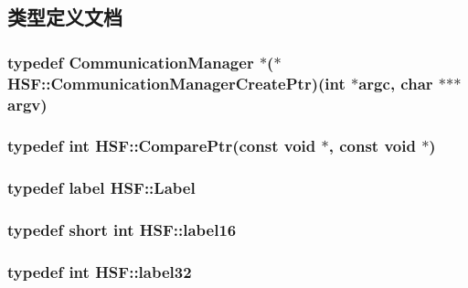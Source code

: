 \subsection{类型定义文档}
\hypertarget{namespaceHSF_ab45d53c3824fdb265043e9e65c1665b5}{
\subsubsection[{CommunicationManagerCreatePtr}]{\setlength{\rightskip}{0pt plus 5cm}typedef {\bf CommunicationManager} $\ast$($\ast$ {\bf HSF::CommunicationManagerCreatePtr})(int $\ast$argc, char $\ast$$\ast$$\ast$argv)}}
\label{namespaceHSF_ab45d53c3824fdb265043e9e65c1665b5}
\hypertarget{namespaceHSF_ad5c260e0fc81004bced4ebf9662faf7f}{
\subsubsection[{ComparePtr}]{\setlength{\rightskip}{0pt plus 5cm}typedef int {\bf HSF::ComparePtr}(const void $\ast$, const void $\ast$)}}
\label{namespaceHSF_ad5c260e0fc81004bced4ebf9662faf7f}
\hypertarget{namespaceHSF_ae65d72be782e989396ebe5ec6ae4c2b6}{
\subsubsection[{Label}]{\setlength{\rightskip}{0pt plus 5cm}typedef label {\bf HSF::Label}}}
\label{namespaceHSF_ae65d72be782e989396ebe5ec6ae4c2b6}
\hypertarget{namespaceHSF_aa78ed21ca4d118cc69c8d1451a4a95f5}{
\subsubsection[{label16}]{\setlength{\rightskip}{0pt plus 5cm}typedef short int {\bf HSF::label16}}}
\label{namespaceHSF_aa78ed21ca4d118cc69c8d1451a4a95f5}
\hypertarget{namespaceHSF_afc477bc8f9a048e05aa8a6d017cf8cae}{
\subsubsection[{label32}]{\setlength{\rightskip}{0pt plus 5cm}typedef int {\bf HSF::label32}}}

